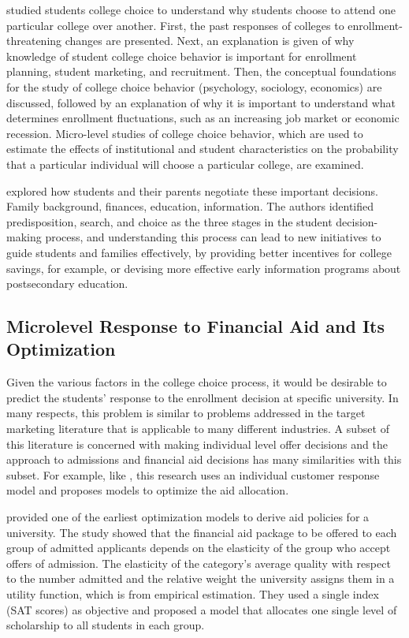 \documentclass[12pt,english]{report}
\begin{document}
\citet{Paulsen1990} studied students college choice to understand why students choose to attend one particular college over another. First, the past responses of colleges to enrollment-threatening changes are presented. Next, an explanation is given of why knowledge of student college choice behavior is important for enrollment planning, student marketing, and recruitment. Then, the conceptual foundations for the study of college choice behavior (psychology, sociology, economics) are discussed, followed by an explanation of why it is important to understand what determines enrollment fluctuations, such as an increasing job market or economic recession. Micro-level studies of college choice behavior, which are used to estimate the effects of institutional and student characteristics on the probability that a particular individual will choose a particular college, are examined.

\citet{Hossler1998} explored how students and their parents negotiate these important decisions. Family background, finances, education, information. The authors identified predisposition, search, and choice as the three stages in the student decision-making process, and understanding this process can lead to new initiatives to guide students and families effectively, by providing better incentives for college savings, for example, or devising more effective early information programs about postsecondary education.

\subsection{Microlevel Response to Financial Aid and Its Optimization} 
Given the various factors in the college choice process, it would be desirable to predict the students' response to the enrollment decision at specific university.  In many respects, this problem is similar to problems addressed in the target marketing literature that is applicable to many different industries. A subset of this literature is concerned with making individual level offer decisions \citep{Venkatesan2004} and the approach to admissions and financial aid decisions has many similarities with this subset.  For example, like \citep{Carter2011}, this research uses an individual customer response model and proposes  models to optimize the aid allocation.

\vspace{0.15in}

\citet{Ehrenberg1984} provided one of the earliest optimization models to derive aid policies for a university. The study showed that the financial aid package to be offered to each group of admitted applicants depends on the elasticity of the group who accept offers of admission.  The elasticity of  the category's average quality with respect to the number admitted and the relative weight the university assigns them in a utility function, which is from empirical estimation. They used a single index (SAT scores) as  objective and proposed a model that allocates one single level of scholarship to all students in each group.
\end{document}
